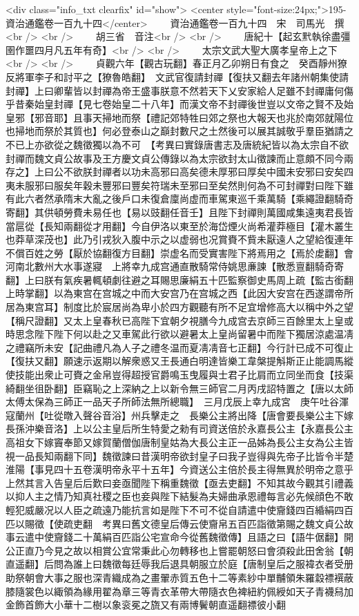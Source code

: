 <div class="info_txt clearfix" id="show">
<center style="font-size:24px;">195-資治通鑑卷一百九十四</center>
  　　資治通鑑卷一百九十四　宋　司馬光　撰<br />
<br />
　　胡三省　音注<br />
<br />
　　唐紀十【起玄黓執徐盡彊圉作噩四月凡五年有奇】<br />
<br />
　　太宗文武大聖大廣孝皇帝上之下<br />
<br />
　　貞觀六年【觀古玩翻】春正月乙卯朔日有食之　癸酉靜州獠反將軍李子和討平之【獠魯皓翻】　文武官復請封禪【復扶又翻去年諸州朝集使請封禪】上曰卿輩皆以封禪為帝王盛事朕意不然若天下乂安家給人足雖不封禪庸何傷乎昔秦始皇封禪【見七卷始皇二十八年】而漢文帝不封禪後世豈以文帝之賢不及始皇邪【邪音耶】且事天掃地而祭【禮記郊特牲曰郊之祭也大報天也兆於南郊就陽位也掃地而祭於其質也】何必登泰山之巔封數尺之土然後可以展其誠敬乎羣臣猶請之不已上亦欲從之魏徵獨以為不可　【考異曰實錄唐書志及唐統紀皆以為太宗自不欲封禪而魏文貞公故事及王方慶文貞公傳錄以為太宗欲封太山徵諫而止意頗不同今兩存之】上曰公不欲朕封禪者以功未高邪曰高矣德未厚邪曰厚矣中國未安邪曰安矣四夷未服邪曰服矣年穀未豐邪曰豐矣符瑞未至邪曰至矣然則何為不可封禪對曰陛下雖有此六者然承隋末大亂之後戶口未復倉廩尚虚而車駕東巡千乘萬騎【乘繩證翻騎奇寄翻】其供頓勞費未易任也【易以豉翻任音壬】且陛下封禪則萬國咸集遠夷君長皆當扈從【長知兩翻從才用翻】今自伊洛以東至於海岱煙火尚希灌莽極目【灌木叢生也莽草深茂也】此乃引戎狄入腹中示之以虚弱也况賞賚不貲未厭遠人之望給復連年不償百姓之勞【厭於協翻復方目翻】崇虚名而受實害陛下將焉用之【焉於䖍翻】會河南北數州大水事遂寢　上將幸九成宫通直散騎常侍姚思亷諫【散悉亶翻騎奇寄翻】上曰朕有氣疾暑輒頓劇往避之耳賜思廉絹五十匹監察御史馬周上疏【監古銜翻上時掌翻】以為東宫在宫城之中而大安宫乃在宫城之西【此因大安宫在西遂謂帝所居為東宫耳】制度比於宸居尚為卑小於四方觀聽有所不足宜增修高大以稱中外之望【稱尺證翻】又太上皇春秋已高陛下宜朝夕視膳今九成宫去京師三百餘里太上皇或時思念陛下陛下何以赴之又車駕此行欲以避暑太上皇尚留暑中而陛下獨居涼處温凊之禮竊所未安【記曲禮凡為人子之禮冬温而夏凊凊音七正翻】今行計已成不可復止【復扶又翻】願速示返期以解衆惑又王長通白明達皆樂工韋槃提斛斯正止能調馬縱使技能出衆止可賚之金帛豈得超授官爵鳴玉曳履與士君子比肩而立同坐而食【技渠綺翻坐徂卧翻】臣竊恥之上深納之上以新令無三師官二月丙戌詔特置之【唐以太師太傅太保為三師正一品天子所師法無所總職】　三月戊辰上幸九成宮　庚午吐谷渾寇蘭州【吐從暾入聲谷音浴】州兵擊走之　長樂公主將出降【唐會要長樂公主下嫁長孫沖樂音洛】上以公主皇后所生特愛之勑有司資送倍於永嘉長公主【永嘉長公主高祖女下嫁竇奉節又嫁賀蘭僧伽唐制皇姑為大長公主正一品姊為長公主女為公主皆視一品長知兩翻下同】魏徵諫曰昔漢明帝欲封皇子曰我子豈得與先帝子比皆令半楚淮陽【事見四十五卷漢明帝永平十五年】今資送公主倍於長主得無異於明帝之意乎上然其言入告皇后后歎曰妾亟聞陛下稱重魏徵【亟去吏翻】不知其故今觀其引禮義以抑人主之情乃知真社稷之臣也妾與陛下結髮為夫婦曲承恩禮每言必先候顔色不敢輕犯威嚴况以人臣之疏遠乃能抗言如是陛下不可不從自請遣中使齎錢四百緍絹四百匹以賜徵【使疏吏翻　考異曰舊文德皇后傳云使齎帛五百匹詣徵第賜之魏文貞公故事云遣中使齎錢二十萬絹百匹詣公宅宣命今從舊魏徵傳】且語之曰【語牛倨翻】開公正直乃今見之故以相賞公宜常秉此心勿轉移也上嘗罷朝怒曰會須殺此田舍翁【朝直遥翻】后問為誰上曰魏徵每廷辱我后退具朝服立於庭【唐制皇后之服褘衣者受册助祭朝會大事之服也深青織成為之畫翬赤質五色十二等素紗中單黼領朱羅縠褾襈蔽膝隨裳色以緅領為緣用翟為章三等青衣革帶大帶隨衣色裨紐約佩綬如天子青襪舄加金飾首飾大小華十二樹以象衮冕之旒又有兩博鬢朝直遥翻褾彼小翻